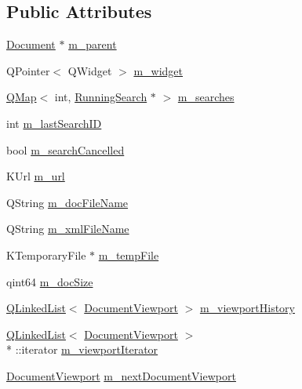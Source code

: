 \subsection*{Public Attributes}
\begin{DoxyCompactItemize}
\item 
\hyperlink{classOkular_1_1Document}{Document} $\ast$ \hyperlink{classOkular_1_1DocumentPrivate_ac921eda41c014869ffec96ecc569c713}{m\+\_\+parent}
\item 
Q\+Pointer$<$ Q\+Widget $>$ \hyperlink{classOkular_1_1DocumentPrivate_a1cc02176f3cd9d24eb4f7968ef893de2}{m\+\_\+widget}
\item 
\hyperlink{classQMap}{Q\+Map}$<$ int, \hyperlink{structRunningSearch}{Running\+Search} $\ast$ $>$ \hyperlink{classOkular_1_1DocumentPrivate_a42420dd45075092b921a829b8e9f2214}{m\+\_\+searches}
\item 
int \hyperlink{classOkular_1_1DocumentPrivate_a83278116cf6b0e38d834c8e416e17de6}{m\+\_\+last\+Search\+I\+D}
\item 
bool \hyperlink{classOkular_1_1DocumentPrivate_ad852d630ad63f8fd4ce1b2cc93179c91}{m\+\_\+search\+Cancelled}
\item 
K\+Url \hyperlink{classOkular_1_1DocumentPrivate_a1a0145bbb16d15c016000a83d0d2ab2b}{m\+\_\+url}
\item 
Q\+String \hyperlink{classOkular_1_1DocumentPrivate_af56dcee87c3465c69da7cea920b95fbb}{m\+\_\+doc\+File\+Name}
\item 
Q\+String \hyperlink{classOkular_1_1DocumentPrivate_aae08e3c4d234247bf3d52608649e7c64}{m\+\_\+xml\+File\+Name}
\item 
K\+Temporary\+File $\ast$ \hyperlink{classOkular_1_1DocumentPrivate_a09a610ec7c029dd3b73580abfc65059d}{m\+\_\+temp\+File}
\item 
qint64 \hyperlink{classOkular_1_1DocumentPrivate_afe0b6665f1386848faf6e6763e7f6cf4}{m\+\_\+doc\+Size}
\item 
\hyperlink{classQLinkedList}{Q\+Linked\+List}$<$ \hyperlink{classOkular_1_1DocumentViewport}{Document\+Viewport} $>$ \hyperlink{classOkular_1_1DocumentPrivate_a47ead6a6650c01fb91ac512e55320f87}{m\+\_\+viewport\+History}
\item 
\hyperlink{classQLinkedList}{Q\+Linked\+List}$<$ \hyperlink{classOkular_1_1DocumentViewport}{Document\+Viewport} $>$\\*
\+::iterator \hyperlink{classOkular_1_1DocumentPrivate_a81a62e8d31d0e7873cd5f5c1590fa2fc}{m\+\_\+viewport\+Iterator}
\item 
\hyperlink{classOkular_1_1DocumentViewport}{Document\+Viewport} \hyperlink{classOkular_1_1DocumentPrivate_af6aae2128fb788ae1693699506a86c0d}{m\+\_\+next\+Document\+Viewport}

\end{DoxyCompactItemize}
